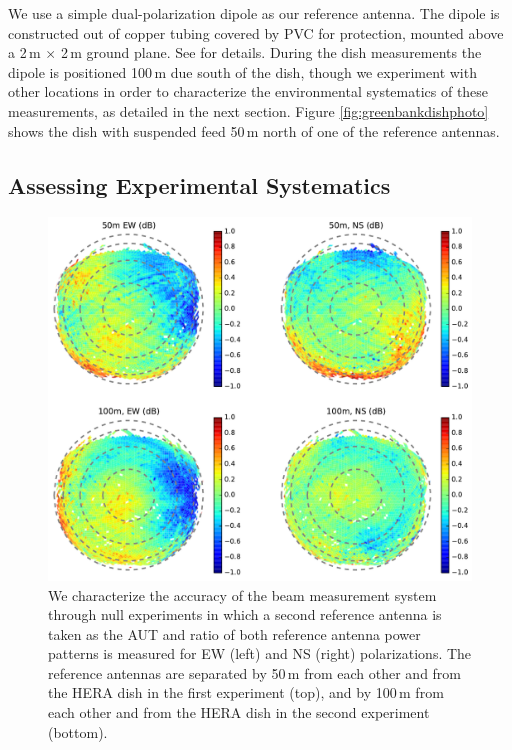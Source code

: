 We use a simple dual-polarization dipole as our reference antenna. The dipole is constructed out of copper tubing covered by PVC for protection, mounted above a 2\,m $\times$ 2\,m ground plane. See \citet{neben15} for details. During the dish measurements the dipole is positioned 100\,m due south of the dish, though we experiment with other locations in order to characterize the environmental systematics of these measurements, as detailed in the next section. Figure \ref{fig:greenbankdishphoto} shows the dish with suspended feed 50\,m north of one of the reference antennas.

\subsection{Assessing Experimental Systematics}

\begin{figure}[h]
\centering
\includegraphics[width=6in]{chap3_hera_beammapping/null_expt_rel_beam_maps.pdf}
\caption[Null experiment results to characterize systematic errors.]{We characterize the accuracy of the beam measurement system through null experiments in which a second reference antenna is taken as the AUT and ratio of both reference antenna power patterns is measured for EW (left) and NS (right) polarizations. The reference antennas are separated by 50\,m from each other and from the HERA dish in the first experiment (top), and by 100\,m from each other and from the HERA dish in the second experiment (bottom).}
\label{fig:nullexptplots}
\end{figure}

